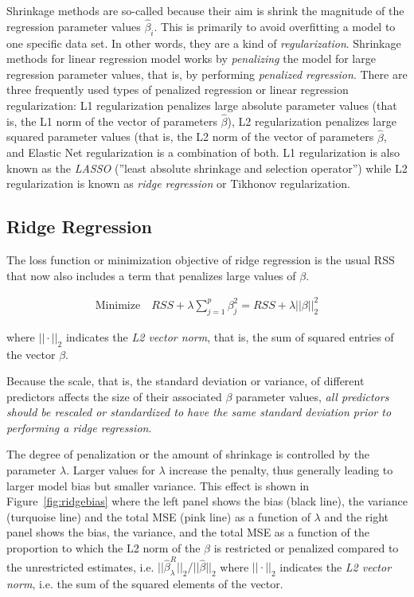Shrinkage methods are so-called because their aim is shrink the magnitude of the regression parameter values $\hat{\beta}_i$. This is primarily to avoid overfitting a model to one specific data set. In other words, they are a kind of \emph{regularization}. Shrinkage methods for linear regression model works by \emph{penalizing} the model for large regression parameter values, that is, by performing \emph{penalized regression}. There are three frequently used types of penalized regression or linear regression regularization: L1 regularization penalizes large absolute parameter values (that is, the L1 norm of the vector of parameters $\hat{\beta}$), L2 regularization penalizes large squared parameter values (that is, the L2 norm of the vector of parameters $\hat{\beta}$, and Elastic Net regularization is a combination of both. L1 regularization is also known as the \emph{LASSO} (''least absolute shrinkage and selection operator'') while L2 regularization is known as \emph{ridge regression} or Tikhonov regularization. 

\subsection{Ridge Regression}

The loss function or minimization objective of ridge regression is the usual RSS that now also includes a term that penalizes large values of $\beta$. 

\begin{align*}
\text{Minimize} \quad RSS + \lambda \sum_{j=1}^p \beta_j^2 = RSS + \lambda ||\beta||_2^2
\end{align*}

\noindent where $||\cdot||_2$ indicates the \emph{L2 vector norm}, that is, the sum of squared entries of the vector $\beta$. 

Because the scale, that is, the standard deviation or variance, of different predictors affects the size of their associated $\beta$ parameter values, \emph{all predictors should be rescaled or standardized to have the same standard deviation prior to performing a ridge regression}. 

The degree of penalization or the amount of shrinkage is controlled by the parameter $\lambda$. Larger values for $\lambda$ increase the penalty, thus generally leading to larger model bias but smaller variance. This effect is shown in Figure~\ref{fig:ridgebias} where the left panel shows the bias (black line), the variance (turquoise line) and the total MSE (pink line) as a function of $\lambda$ and the right panel shows the bias, the variance, and the total MSE as a function of the proportion to which the L2 norm of the $\beta$ is restricted or penalized compared to the unrestricted estimates, i.e. $||\hat{\beta}^R_\lambda||_2 / ||\hat{\beta}||_2$ where $||\cdot||_2$ indicates the \emph{L2 vector norm}, i.e. the sum of the squared elements of the vector.

